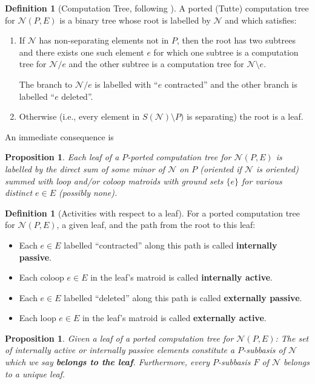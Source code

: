 \documentclass[12pt]{article}
\newtheorem{proposition}[theorem]{Proposition}
\theoremstyle{definition}
\newtheorem{definition}[theorem]{Definition}
\begin{document}
\begin{definition}[Computation Tree, following \cite{GordonMcMachonGreedoid}]
\label{CompTreeDef}
A ported (Tutte) computation tree for $\mathcal{N}(P,E)$ is a
binary tree whose root is labelled by $\mathcal{N}$ and which satisfies:
\begin{enumerate}
\item If $\mathcal{N}$ has non-separating elements not in $P$, then 
the root has two subtrees and there exists one such element $e$ for which 
one subtree is a computation tree
for $\mathcal{N}/e$ and the other subtree is a computation tree for 
$\mathcal{N}\setminus e$.

The branch to $\mathcal{N}/e$ is labelled with ``$e$ contracted'' and 
the other branch is labelled ``$e$ deleted''.
\item Otherwise (i.e., every element in $S(\mathcal{N})\setminus P)$
is separating) the root is a leaf.
\end{enumerate}
\end{definition}

An immediate consequence is
\begin{proposition}
Each leaf of a $P$-ported computation tree for $\mathcal{N}(P,E)$
is labelled by the direct sum of some minor of $\mathcal{N}$ on $P$ 
(oriented if $\mathcal{N}$ is oriented) 
summed with loop and/or coloop matroids with 
ground sets $\{e\}$ for various distinct $e\in E$ (possibly none).
\end{proposition}

\begin{definition}[Activities with respect to a leaf]
\label{ActivityTreeDef}
For a ported computation tree for $\mathcal{N}(P,E)$, 
a given leaf, and the path from the root to this leaf:
\begin{itemize}
\item Each $e\in E$ labelled ``contracted'' along this path
is called \textbf{internally passive}.
\item Each coloop $e\in E$ in the leaf's matroid is
called \textbf{internally active}.
\item Each $e\in E$ labelled ``deleted'' along this path
is called \textbf{externally passive}.
\item Each loop $e\in E$ in the leaf's matroid is
called \textbf{externally active}.
\end{itemize}
\end{definition}

\begin{proposition}
Given a leaf of a ported computation tree for $\mathcal{N}(P,E)$:
The set of internally active or internally passive elements 
constitute a 
$P$-subbasis of $\mathcal{N}$ which we say 
\textbf{belongs to the leaf}.  
Furthermore, every $P$-subbasis $F$ of $\mathcal{N}$ belongs to a unique leaf.
\end{proposition}
\end{document}
